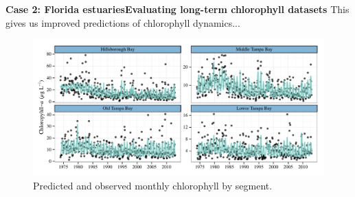 \documentclass[serif]{beamer}\usepackage[]{graphicx}\usepackage[]{color}
\begin{document}
\begin{frame}{\textbf{Case 2: Florida estuaries}}{\textbf{Evaluating long-term chlorophyll datasets}}
This gives us improved predictions of chlorophyll dynamics...
\begin{figure}[!ht]

{\centering \includegraphics[width=\linewidth]{fig/predvals-1} 

}

\caption[Predicted and observed monthly chlorophyll by segment]{Predicted and observed monthly chlorophyll by segment.}\label{fig:predvals}
\end{figure}


\end{frame}
\end{document}
